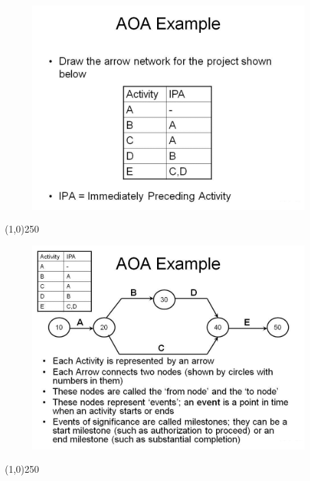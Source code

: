 \begin{frame}
\begin{figure}
	\centering
		\includegraphics[width = 10.5cm]{oldnotes/Slide46.jpg}
\end{figure}
\end{frame}
\begin{center}\line(1,0){250}\end{center}





\begin{frame}
\begin{figure}
	\centering
		\includegraphics[width = 10.5cm]{oldnotes/Slide47.jpg}
\end{figure}
\end{frame}
\begin{center}\line(1,0){250}\end{center}





